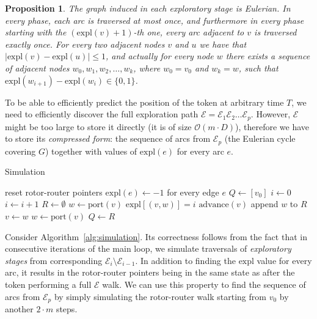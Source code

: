 \documentclass{article}[11pt,letter]
\newtheorem{proposition}[definition]{Proposition}
\newcommand{\bigo}{\mathcal{O}}
\newcommand{\expl}{\mathrm{expl}}
\newcommand{\walk}{\mathcal{E}}
\begin{document}
\begin{proposition}
\label{proposition:3}
The graph induced in each \emph{exploratory stage} is Eulerian. In every phase, each arc is traversed at most once, and furthermore in every phase starting with the $(\expl(v)+1)$-th one, every arc adjacent to $v$ is traversed exactly once. For every two adjacent nodes $v$ and $u$ we have
that $|\expl(v) - \expl(u)| \le 1$, and actually for every node $w$ there exists a sequence of adjacent nodes  $w_0,w_1,w_2,\ldots,w_k$, where $w_0 = v_0$ and $w_k = w$, such that $ \expl(w_{i+1})-\expl(w_i) \in \{0,1\}$.
\end{proposition}

To be able to efficiently predict the position of the token at arbitrary time $T$, we need to efficiently discover the full exploration path
$\walk = \walk_1 \walk_2 \ldots \walk_p$.
However, $\walk$ might be too large to store it directly (it is of size $\bigo(m\cdot D)$), therefore we have to store its \emph{compressed form}:
the sequence of arcs from $\walk_p$ (the Eulerian cycle covering $G$) together with values of $\expl(e)$ for every arc $e$.


\begin{algorithm}
\caption{Simulation}
\label{alg:simulation}
\begin{algorithmic}[1]
\STATE reset rotor-router pointers
\STATE $\expl(e) \gets -1$ for every edge $e$
\STATE $Q \gets [v_{0}]$ 
\STATE $i \gets 0$
	\STATE $i \leftarrow i+1$
	\STATE $R \leftarrow \emptyset$ 
		\STATE $w \leftarrow \text{port}(v)$
		\WHILE{$\expl[ (v, w) ] = -1$}
			\STATE $\expl[ (v,w) ] = i$
			\STATE $\text{advance}(v)$ 
			\STATE  append $w$ to $R$
			\STATE $v \gets w$ 
			\STATE $w \gets \text{port}(v)$
		\ENDWHILE
	\ENDFOR
	\STATE $Q \leftarrow R$
\ENDWHILE
\end{algorithmic}
\end{algorithm}

Consider Algorithm~\ref{alg:simulation}. Its correctness follows from the fact that in consecutive iterations of the main loop, we simulate traversals of \emph{exploratory stages} from corresponding $\walk_i \setminus \walk_{i-1}$. In addition to finding the $\expl$ value for every arc, it results in the rotor-router pointers being in the same state as after the token performing a full $\walk$ walk.
We can use this property to find the sequence of arcs from $\walk_{p}$ by simply simulating the rotor-router walk starting from $v_0$ by another $2\cdot m$ steps.
\end{document}
